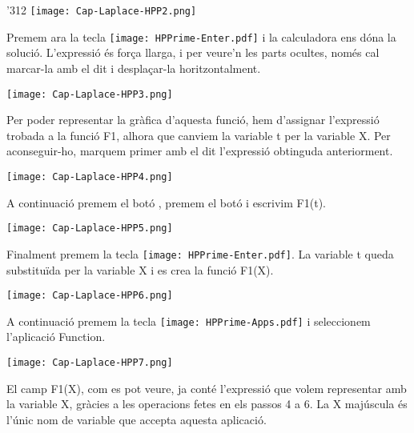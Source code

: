 \begin{exemple}
\begin{dingautolist}{'312}
            \texttt{[image: Cap-Laplace-HPP2.png]}\vspace{5mm}

         \item Premem ara la tecla \texttt{[image: HPPrime-Enter.pdf]} i la calculadora ens dóna la solució. L'expressió és força llarga, i per veure'n les parts ocultes, només cal marcar-la amb el dit i desplaçar-la horitzontalment.

            \texttt{[image: Cap-Laplace-HPP3.png]}\vspace{5mm}

         \item Per poder representar la gràfica d'aquesta funció, hem d'assignar l'expressió trobada a la  funció \textsf{F1}, alhora que canviem la variable \textsf{t} per la variable \textsf{X}. Per aconseguir-ho, marquem primer amb el dit l'expressió obtinguda anteriorment.

            \texttt{[image: Cap-Laplace-HPP4.png]}\vspace{5mm}

         \item A continuació premem el botó  , premem el botó  i  escrivim  \textsf{F1(t)}.

             \texttt{[image: Cap-Laplace-HPP5.png]}\vspace{5mm}

         \item Finalment premem la tecla \texttt{[image: HPPrime-Enter.pdf]}. La variable \textsf{t} queda substituïda per la variable \textsf{X} i es crea la funció \textsf{F1(X)}.

          \texttt{[image: Cap-Laplace-HPP6.png]}\vspace{5mm}


         \item A continuació premem  la tecla \texttt{[image: HPPrime-Apps.pdf]} i seleccionem  l'aplicació \textsf{Function}.

            \texttt{[image: Cap-Laplace-HPP7.png]}\vspace{5mm}

          \item El camp  \textsf{F1(X)}, com es pot veure, ja conté l'expressió que volem representar amb la variable \textsf{X}, gràcies a les operacions fetes en els passos 4 a 6. La \textsf{X} majúscula és l'únic nom de variable que accepta aquesta aplicació.


\end{dingautolist}
\end{exemple}
